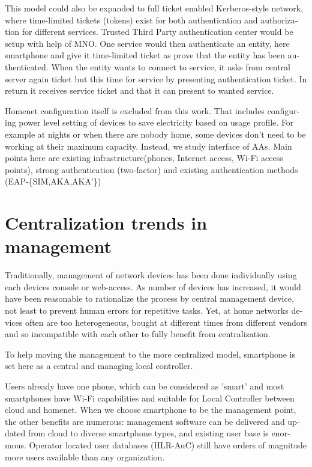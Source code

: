 \documentclass[12pt,a4paper,english]{tutthesis}
\begin{document}
\begin{otherlanguage}{english}
This model could also be expanded to full ticket enabled
Kerberos-style network, where time-limited tickets (tokens) exist for
both authentication and authorization for different services. Trusted
Third Party authentication center would be setup with help of MNO.
One service would then authenticate an entity, here smartphone and
give it time-limited ticket as prove that the entity has been authenticated.
When the entity wants to connect to service, it asks from central 
server again ticket but this time for service by presenting
authentication ticket. In return it receives service ticket and that
it can present to wanted service.






Homenet configuration itself is excluded from this work.
That includes configuring power level setting of devices to save electricity
based on usage profile. For example at nights or when there are nobody
home, some devices don't need to be working at their maximum
capacity. Instead, we study interface of AAs.  Main points here
are existing infrastructure(phones, Internet access, Wi-Fi
access points), strong authentication (two-factor) and existing
authentication methods (EAP-\{SIM,AKA,AKA'\})
\section{Centralization trends in management}
\label{sec-3-2}

Traditionally, management of network devices has been done
individually using each devices console or web-access.  As number of
devices has increased, it would have been reasonable to rationalize
the process by central management device, not least to prevent human
errors for repetitive tasks.  Yet, at home networks devices often are
too heterogeneous, bought at different times from different vendors
and so incompatible with each other to fully benefit from
centralization.

To help moving the management to the more centralized model,
smartphone is set here as a central and managing local controller.


Users already have one phone, which can be considered as
'smart' and most smartphones have Wi-Fi capabilities and suitable for 
Local Controller between cloud and homenet.
When we choose smartphone to be the management point, the other benefits are
numerous:  management software can be delivered and
updated from cloud to diverse smartphone types, and existing user
base is enormous.
Operator located user databases (HLR-AuC) still have orders of
magnitude more users available than any organization. 





\end{otherlanguage}
\end{document}
